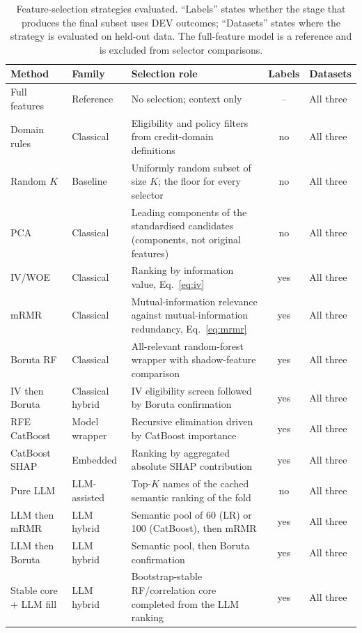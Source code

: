 \documentclass[final,5p,twocolumn]{elsarticle}
\newcommand{\Kfeat}{K}
\begin{document}
\begin{table}[htbp]
\centering
\footnotesize
\begin{threeparttable}
\caption{Feature-selection strategies evaluated. ``Labels'' states whether the stage that produces the final subset uses DEV outcomes; ``Datasets'' states where the strategy is evaluated on held-out data. The full-feature model is a reference and is excluded from selector comparisons.}
\label{tab:methods}
\begin{tabular}{@{}llL{46mm}cl@{}}
\toprule
Method & Family & Selection role & Labels & Datasets \\
\midrule
Full features & Reference & No selection; context only & -- & All three \\
Domain rules & Classical & Eligibility and policy filters from credit-domain definitions & no & All three \\
Random $\Kfeat$ & Baseline & Uniformly random subset of size $\Kfeat$; the floor for every selector & no & All three \\
PCA & Classical & Leading components of the standardised candidates (components, not original features) & no & All three \\
IV/WOE & Classical & Ranking by information value, Eq.~\eqref{eq:iv} & yes & All three \\
mRMR & Classical & Mutual-information relevance against mutual-information redundancy, Eq.~\eqref{eq:mrmr} & yes & All three \\
Boruta RF & Classical & All-relevant random-forest wrapper with shadow-feature comparison & yes & All three \\
IV then Boruta & Classical hybrid & IV eligibility screen followed by Boruta confirmation & yes & All three \\
RFE CatBoost & Model wrapper & Recursive elimination driven by CatBoost importance & yes & All three \\
CatBoost SHAP & Embedded & Ranking by aggregated absolute SHAP contribution & yes & All three \\
Pure LLM & LLM-assisted & Top-$\Kfeat$ names of the cached semantic ranking of the fold & no & All three \\
LLM then mRMR & LLM hybrid & Semantic pool of 60 (LR) or 100 (CatBoost), then mRMR & yes & All three \\
LLM then Boruta & LLM hybrid & Semantic pool, then Boruta confirmation & yes & All three \\
Stable core + LLM fill & LLM hybrid & Bootstrap-stable RF/correlation core completed from the LLM ranking & yes & All three \\

\end{tabular}
\end{threeparttable}
\end{table}
\end{document}
